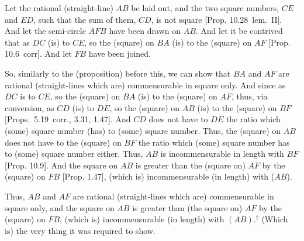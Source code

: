 \begin{Parallel}{}{}
{\epsfysize=1.7in
\centerline{}

Let the rational (straight-line) $AB$ be laid out, and the two square
numbers, $CE$ and $ED$, such that the sum of them, $CD$,
is not square [Prop. 10.28~lem.~II].
And let the semi-circle $AFB$ have been drawn on $AB$. And let it
be contrived that as $DC$ (is) to $CE$, so the (square) on
$BA$ (is) to the (square) on $AF$ [Prop. 10.6~corr].
And let $FB$ have been joined.

So, similarly to the (proposition) before this, we can show that $BA$ and
$AF$ are rational (straight-lines which are) commensurable in square only.
And since as $DC$ is to $CE$, so the (square) on $BA$ (is) to the (square)
on $AF$, thus, via conversion, as $CD$ (is) to $DE$, so the (square) on
$AB$ (is) to the (square) on $BF$ [Props.~5.19~corr., 3.31, 1.47]. And
$CD$ does not have to $DE$ the ratio which (some) square number
(has) to (some) square number. Thus, the (square) on $AB$
does not have to the (square) on $BF$ the ratio which (some)
square number has to (some) square number either. Thus, $AB$ is
incommensurable in length with $BF$ [Prop. 10.9].
And the square on $AB$ is greater than the (square on) $AF$ by the
(square) on $FB$  [Prop. 1.47], (which is) incommensurable (in length) with ($AB$).

Thus, $AB$ and $AF$ are rational (straight-lines which are) commensurable
in square only, and the square on $AB$ is greater than (the square on) $AF$
by the (square) on $FB$, (which is) incommensurable (in length) with
 $(AB)$.$^\dag$ (Which is) the very thing it was required to show.}
\end{Parallel}



